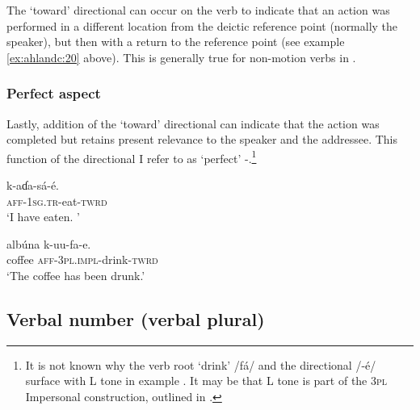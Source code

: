 \documentclass[output=paper]{langsci/langscibook}
\begin{document}
The ‘toward’ directional can occur on the verb to indicate that an action was performed in a different location from the deictic reference point (normally the speaker), but then with a return to the reference point (see example \ref{ex:ahlandc:20} above). This is generally true for non-motion verbs in .

\subsubsection{Perfect aspect}\label{sec:ahlandc:4.6.3}

Lastly, addition of the ‘toward’ directional can indicate that the action was completed but retains present relevance to the speaker and the addressee. This function of the directional I refer to as ‘perfect’ -.\footnote{It is not known why the verb root ‘drink’ /fá/ and the directional /-\'{e}/ surface with L tone in example .  It may be that L tone is part of the 3\textsc{pl} Impersonal construction, outlined in .}

\ea\label{ex:ahlandc:34}
\gll
k-aɗa-sá-é.  \\
\textsc{aff-1sg.tr}-eat-\textsc{twrd} \\
\glt
‘I have eaten. ’
\z

\ea\label{ex:ahlandc:35}
\gll
alb\'{u}na k-uu-fa-e. \\
coffee \textsc{aff-3pl.impl}{}-drink-\textsc{twrd} \\
\glt
‘The coffee has been drunk.’
\z


\subsection{Verbal number (verbal plural)}\label{sec:ahlandc:4.7}
\end{document}
